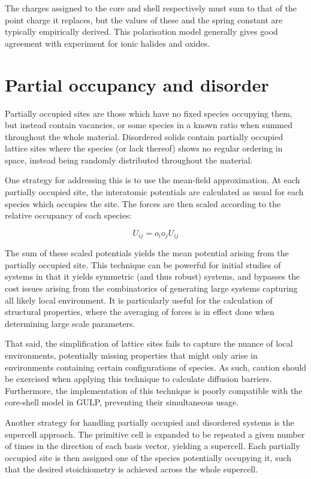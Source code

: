 The charges assigned to the core and shell respectively must sum to that of the point charge it replaces, but the values of these and the spring constant are typically empirically derived.
This polarisation model generally gives good agreement with experiment for ionic halides and oxides.

\section{Partial occupancy and disorder}
Partially occupied sites are those which have no fixed species occupying them, but instead contain vacancies, or some species in a known ratio when summed throughout the whole material.
Disordered solids contain partially occupied lattice sites where the species (or lack thereof) shows no regular ordering in space, instead being randomly distributed throughout the material.



One strategy for addressing this is to use the mean-field approximation. 
At each partially occupied site, the interatomic potentials are calculated as usual for each species which occupies the site. 
The forces are then scaled according to the relative occupancy of each species:

$$
U_{ij} = o_io_jU_{ij}
$$

The sum of these scaled potentials yields the mean potential arising from the partially occupied site.
This technique can be powerful for initial studies of systems in that it yields symmetric (and thus robust) systems, and bypasses the cost issues arising from the combinatorics of generating large systems capturing all likely local environment.
It is particularly useful for the calculation of structural properties, where the averaging of forces is in effect done when determining large scale parameters.

That said, the simplification of lattice sites fails to capture the nuance of local environments, potentially missing properties that might only arise in environments containing certain configurations of species.
As such, caution should be exercised when applying this technique to calculate diffusion barriers.
Furthermore, the implementation of this technique is poorly compatible with the core-shell model in GULP, preventing their simultaneous usage.

Another strategy for handling partially occupied and disordered systems is the supercell approach.
The primitive cell is expanded to be repeated a given number of times in the direction of each basis vector, yielding a supercell.
Each partially occupied site is then assigned one of the species potentially occupying it, such that the desired stoichiometry is achieved across the whole supercell.

